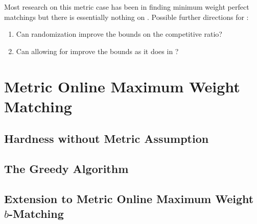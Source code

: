 \noindent Most research on this metric case has been in finding minimum weight perfect matchings but there is essentially nothing on \momwm{}. 
Possible further directions for \momwm{}:
\begin{enumerate}
    \item Can randomization improve the bounds on the competitive ratio?
    \item Can allowing for \bmatch{} improve the bounds as it does in \omm{}?
\end{enumerate} 

\section{Metric Online Maximum Weight Matching}

\subsection{Hardness without Metric Assumption}
\label{subsec:hardness}

\subsection{The Greedy Algorithm}

\subsection{Extension to Metric Online Maximum Weight $b$-Matching}